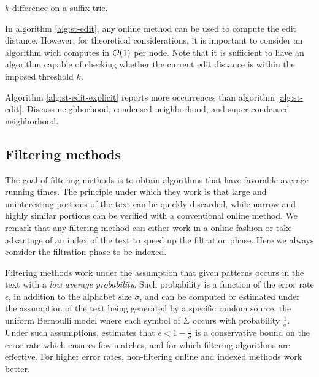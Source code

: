 \begin{algorithm}[h]
\caption{$k$-difference on a suffix trie.}
\label{alg:st-edit}
\begin{algorithmic}[1]
	\ForAll {$\Cn \in \Ci(\Tn)$}
		\State {}
	\EndFor
\EndProcedure
\end{algorithmic}
\end{algorithm}

In algorithm \ref{alg:st-edit}, any online method can be used to compute the edit distance.
However, for theoretical considerations, it is important to consider an algorithm wich computes in $\mathcal{O}(1)$ per node.
Note that it is sufficient to have an algorithm capable of checking whether the current edit distance is within the imposed threshold $k$.

Algorithm \ref{alg:st-edit-explicit} reports more occurrences than algorithm \ref{alg:st-edit}.
Discuss neighborhood, condensed neighborhood, and super-condensed neighborhood.


\subsection{Filtering methods}
\label{sec:intro:filtering}

The goal of filtering methods is to obtain algorithms that have favorable average running times.
The principle under which they work is that large and uninteresting portions of the text can be quickly discarded, while narrow and highly similar portions can be verified with a conventional online method.
We remark that any filtering method can either work in a online fashion or take advantage of an index of the text to speed up the filtration phase.
Here we always consider the filtration phase to be indexed.

Filtering methods work under the assumption that given patterns occurs in the text with a \emph{low average probability}.
Such probability is a function of the error rate $\epsilon$, in addition to the alphabet size $\sigma$, and can be computed or estimated under the assumption of the text being generated by a specific random source, \eg the uniform Bernoulli model where each symbol of $\Sigma$ occurs with probability $\frac{1}{\sigma}$.
Under such assumptions, \citep{Navarro2000} estimates that $\epsilon < 1 - \frac{1}{\sigma}$ is a conservative bound on the error rate which ensures few matches, and for which filtering algorithms are effective.
For higher error rates, non-filtering online and indexed methods work better.

